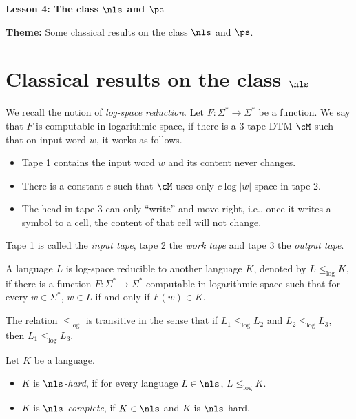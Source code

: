 \documentclass[11pt, a4paper]{article}
\renewcommand{\lesson}{4}
\renewcommand{\lessontitle}{The class $\nls$ and $\ps$}
\renewcommand{\fulltitle}{Lesson \lesson: \lessontitle}
\begin{document}
\date{}



\begin{center}
{\Large {\bf \fulltitle}}
\end{center}
\vspace{0.5cm}

\noindent
{\bf Theme:} Some classical results on the class $\nls$ and $\ps$.


\section{Classical results on the class $\nls$}

We recall the notion of {\em log-space reduction}.
Let $F:\Sigma^*\to\Sigma^*$ be a function.
We say that $F$ is computable in logarithmic space, 
if there is a 3-tape DTM $\cM$ such that on input word $w$,
it works as follows.
\begin{itemize}\itemsep=0pt
\item
Tape 1 contains the input word $w$ and its content never changes.
\item
There is a constant $c$ such that $\cM$ uses only $c\log |w|$ space in tape 2.
\item
The head in tape 3 can only ``write'' and move right, i.e.,
once it writes a symbol to a cell, the content of that cell will not change.
\end{itemize}
Tape 1 is called the {\em input tape}, tape 2 the {\em work tape} and tape 3 the {\em output tape}.

\begin{definition}
\label{def:log-space-reduction}
A language $L$ is log-space reducible to another language $K$,
denoted by $L\leq_{\log} K$, if
there is a function $F:\Sigma^*\to\Sigma^*$ computable in logarithmic space such that
for every $w\in \Sigma^*$, $w\in L$ if and only if $F(w)\in K$.
\end{definition}

\begin{remark}
The relation $\leq_{\log}$ is transitive in the sense that
if $L_1\leq_{\log} L_2$ and $L_2\leq_{\log} L_3$,
then $L_1\leq_{\log} L_3$.
\end{remark}


\begin{definition}
\label{def:nl-complete}
Let $K$ be a language.
\begin{itemize}\itemsep=0pt
\item
$K$ is {\em $\nls$-hard}, if for every language $L\in \nls$, $L\leq_{\log} K$.
\item
$K$ is {\em $\nls$-complete}, if $K \in \nls$ and $K$ is $\nls$-hard.
\end{itemize}
\end{definition}
\end{document}
